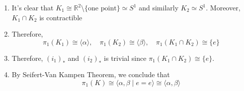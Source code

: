 \begin{example}
\begin{enumerate}
\begin{figure}[H]
\end{figure}
\begin{enumerate}
\item
It's clear that $K_1\cong\mathbb{R}^2\setminus\{\text{one point}\}\simeq S^1$ and similarly $K_2\simeq S^1$. Moreover, $K_1\cap K_2$ is contractible
\item
Therefore,
\[
\pi_1(K_1)\cong\langle\alpha\rangle,\quad
\pi_1(K_2)\cong\langle\beta\rangle,\quad
\pi_1(K_1\cap K_2)\cong\{e\}
\]
\item
Therefore, $(i_1)_*$ and $(i_2)_*$ is trivial since $\pi_1(K_1\cap K_2)\cong\{e\}$.
\item
By Seifert-Van Kampen Theorem, we conclude that
\[
\pi_1(K) \cong \langle
\alpha,\beta\mid e=e
\rangle
\cong
\langle
\alpha,\beta
\rangle
\]
\end{enumerate}


\end{enumerate}
\end{example}
























